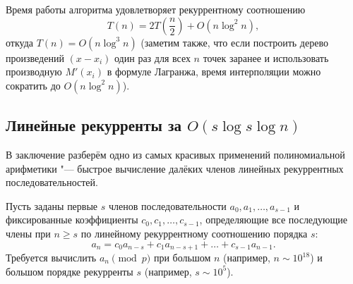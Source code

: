 Время работы алгоритма удовлетворяет рекуррентному соотношению
\[
    T(n) = 2 T\!\left(\frac{n}{2}\right) + O(n \log^2 n),
\]
откуда $T(n) = O(n \log^3 n)$ (заметим также, что если построить дерево произведений $(x - x_i)$ один раз для всех $n$ точек заранее и использовать производную $M'(x_i)$ в формуле Лагранжа, время интерполяции можно сократить до $O(n \log^2 n)$).

\subsection{Линейные рекурренты за \texorpdfstring{$O(s \log s \log n)$}{O(s log s log n)}}

В заключение разберём одно из самых красивых применений полиномиальной арифметики "--- быстрое вычисление далёких членов линейных рекуррентных последовательностей.

Пусть заданы первые $s$ членов последовательности $a_0, a_1, \dots, a_{s-1}$ и фиксированные коэффициенты $c_0, c_1, \dots, c_{s-1}$, определяющие все последующие члены при $n \ge s$ по линейному рекуррентному соотношению порядка $s$:
\begin{equation}\label{eq:lin_rec}
    a_n = c_0 a_{n-s} + c_1 a_{n-s+1} + \dots + c_{s-1} a_{n-1}.
\end{equation}
Требуется вычислить $a_n \pmod p$ при большом $n$ (например, $n \sim 10^{18}$) и большом порядке рекурренты $s$ (например, $s \sim 10^5$).

